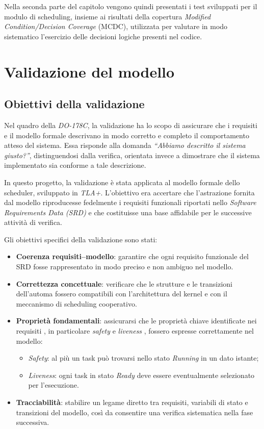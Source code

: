 \documentclass[italian, Lau, oneside]{sapthesis} %
\begin{document}
Nella seconda parte del capitolo vengono quindi presentati i test sviluppati per il modulo di scheduling, insieme ai risultati della copertura \textit{Modified Condition/Decision Coverage} (MCDC), utilizzata per valutare in modo sistematico l’esercizio delle decisioni logiche presenti nel codice.

\section{Validazione del modello}
\label{sec:validazione}

\subsection{Obiettivi della validazione}

Nel quadro della \textit{DO-178C}, la validazione ha lo scopo di assicurare che i requisiti e il modello formale descrivano in modo corretto e completo il comportamento atteso del sistema.  
Essa risponde alla domanda \textit{“Abbiamo descritto il sistema giusto?”}, distinguendosi dalla verifica, orientata invece a dimostrare che il sistema implementato sia conforme a tale descrizione.

In questo progetto, la validazione è stata applicata al modello formale dello scheduler, sviluppato in \textit{TLA+}. L’obiettivo era accertare che l’astrazione fornita dal modello riproducesse fedelmente i requisiti funzionali riportati nello \textit{Software Requirements Data (SRD)} e che costituisse una base affidabile per le successive attività di verifica.

Gli obiettivi specifici della validazione sono stati:

\begin{itemize}
    \item \textbf{Coerenza requisiti–modello}: garantire che ogni requisito funzionale del SRD fosse rappresentato in modo preciso e non ambiguo nel modello.
    \item \textbf{Correttezza concettuale}: verificare che le strutture e le transizioni dell’automa fossero compatibili con l’architettura del kernel e con il meccanismo di scheduling cooperativo.
    \item \textbf{Proprietà fondamentali}: assicurarsi che le proprietà chiave identificate nei requisiti , in particolare \textit{safety} e \textit{liveness} , fossero espresse correttamente nel modello:
    \begin{itemize}
        \item \emph{Safety}: al più un task può trovarsi nello stato \textit{Running} in un dato istante;
        \item \emph{Liveness}: ogni task in stato \textit{Ready} deve essere eventualmente selezionato per l’esecuzione.
    \end{itemize}
    \item \textbf{Tracciabilità}: stabilire un legame diretto tra requisiti, variabili di stato e transizioni del modello, così da consentire una verifica sistematica nella fase successiva.
\end{itemize}
\end{document}
